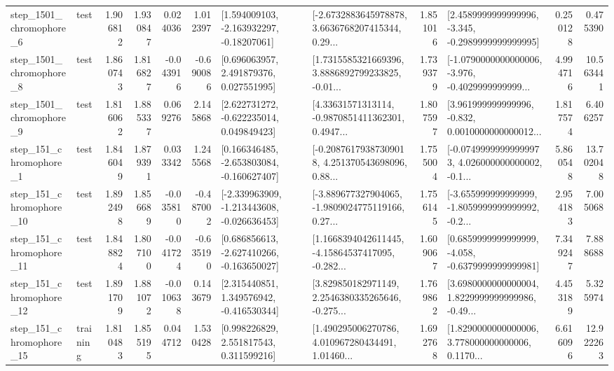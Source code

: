 \begin{tabular}{llrrrrllrlrr}
  step\_1501\_chromophore\_6 &      test &      1.906812 &    1.930847 &      0.024036 &  1.012397 &    [1.594009103, -2.163932297, -0.18207061] &  [-2.6732883645978878, 3.6636768207415344, 0.29... &       1.851016 &  [2.4589999999999996, -3.345, -0.2989999999999995] &            0.250128 &          0.475390 \\
  step\_1501\_chromophore\_8 &      test &      1.860743 &    1.816827 &     -0.043916 & -0.690086 &     [0.696063957, 2.491879376, 0.027551995] &  [1.7315585321669396, 3.8886892799233825, -0.01... &       1.739379 &  [-1.0790000000000006, -3.976, -0.4029999999999... &            4.994716 &         10.563441 \\
  step\_1501\_chromophore\_9 &      test &      1.816062 &    1.885337 &      0.069276 &  2.145868 &    [2.622731272, -0.622235014, 0.049849423] &  [4.33631571313114, -0.9870851411362301, 0.4947... &       1.807597 &  [3.961999999999996, -0.832, 0.0010000000000012... &            1.817574 &          6.406257 \\
   step\_151\_chromophore\_1 &      test &      1.846049 &    1.879391 &      0.033342 &  1.245568 &   [0.166346485, -2.653803084, -0.160627407] &  [-0.20876179387309018, 4.251370543698096, 0.88... &       1.755004 &  [-0.07499999999999973, 4.026000000000002, -0.1... &            5.860548 &         13.702048 \\
  step\_151\_chromophore\_10 &      test &      1.892498 &    1.856689 &     -0.035810 & -0.487002 &  [-2.339963909, -1.213443608, -0.026636453] &  [-3.889677327904065, -1.9809024775119166, 0.27... &       1.756145 &  [-3.655999999999999, -1.8059999999999992, -0.2... &            2.954183 &          7.005068 \\
  step\_151\_chromophore\_11 &      test &      1.848824 &    1.807100 &     -0.041724 & -0.635190 &   [0.686856613, -2.627410266, -0.163650027] &  [1.1668394042611445, -4.15864537417095, -0.282... &       1.609067 &  [0.6859999999999999, -4.058, -0.6379999999999981] &            7.349247 &          7.888688 \\
  step\_151\_chromophore\_12 &      test &      1.891709 &    1.881072 &     -0.010638 &  0.143679 &    [2.315440851, 1.349576942, -0.416530344] &  [3.829850182971149, 2.2546380335265646, -0.275... &       1.769862 &  [3.6980000000000004, 1.8229999999999986, -0.49... &            4.453189 &          5.325974 \\
  step\_151\_chromophore\_15 &  training &      1.810483 &    1.855195 &      0.044712 &  1.530428 &     [0.998226829, 2.551817543, 0.311599216] &  [1.490295006270786, 4.010967280434491, 1.01460... &       1.692768 &  [1.8290000000000006, 3.778000000000006, 0.1170... &            6.616096 &         12.922263 \\

\end{tabular}
